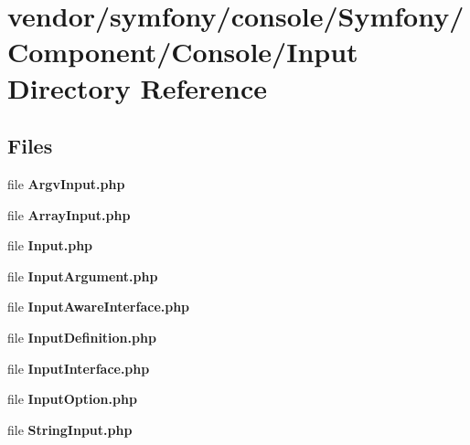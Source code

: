 \section{vendor/symfony/console/\+Symfony/\+Component/\+Console/\+Input Directory Reference}
\label{dir_14e756372ed6eacc164f65f6226a9e21}
\subsection*{Files}
\begin{DoxyCompactItemize}
\item 
file {\bf Argv\+Input.\+php}
\item 
file {\bf Array\+Input.\+php}
\item 
file {\bf Input.\+php}
\item 
file {\bf Input\+Argument.\+php}
\item 
file {\bf Input\+Aware\+Interface.\+php}
\item 
file {\bf Input\+Definition.\+php}
\item 
file {\bf Input\+Interface.\+php}
\item 
file {\bf Input\+Option.\+php}
\item 
file {\bf String\+Input.\+php}
\end{DoxyCompactItemize}
